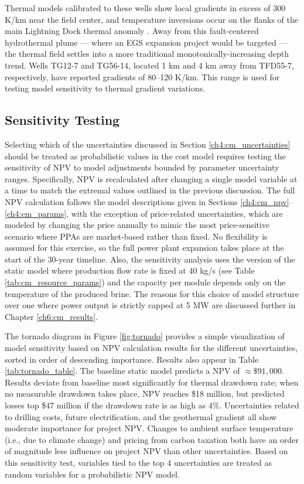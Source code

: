Thermal models calibrated to these wells show local gradients in excess of 300 K/km near the field center, and temperature inversions occur on the flanks of the main Lightning Dock thermal anomaly \citep[see Figs.\ 23--24,][]{cunniff_final_2005}. Away from this fault-centered hydrothermal plume --- where an EGS expansion project would be targeted --- the thermal field settles into a more traditional monotonically-increasing depth trend. Wells TG12-7 and TG56-14, located 1 km and 4 km away from TFD55-7, respectively, have reported gradients of 80--120 K/km. This range is used for testing model sensitivity to thermal gradient variations.

\subsection{Sensitivity Testing}\label{ch4:sensitivity}
Selecting which of the uncertainties discussed in Section \ref{ch4:cm_uncertainties} should be treated as probabilistic values in the cost model requires testing the sensitivity of NPV to model adjustments bounded by parameter uncertainty ranges. Specifically, NPV is recalculated after changing a single model variable at a time to match the extremal values outlined in the previous discussion. The full NPV calculation follows the model descriptions given in Sections \ref{ch4:cm_npv}--\ref{ch4:cm_params}, with the exception of price-related uncertainties, which are modeled by changing the price annually to mimic the most price-sensitive scenario where PPAs are market-based rather than fixed. No flexibility is assumed for this exercise, so the full power plant expansion takes place at the start of the 30-year timeline. Also, the sensitivity analysis uses the version of the static model where production flow rate is fixed at 40 kg/s (see Table \ref{tab:cm_resource_params}) and the capacity per module depends only on the temperature of the produced brine. The reasons for this choice of model structure over one where power output is strictly capped at 5 MW are discussed further in Chapter \ref{ch6:cm_results}.

The tornado diagram in Figure \ref{fig:tornado} provides a simple visualization of model sensitivity based on NPV calculation results for the different uncertainties, sorted in order of descending importance. Results also appear in Table \ref{tab:tornado_table}. The baseline static model predicts a NPV of $\approx \$91,000$. Results deviate from baseline most significantly for thermal drawdown rate; when no measurable drawdown takes place, NPV reaches \$18 million, but predicted losses top \$47 million if the drawdown rate is as high as 4\%. Uncertainties related to drilling costs, future electrification, and the geothermal gradient all show moderate importance for project NPV. Changes to ambient surface temperature (i.e., due to climate change) and pricing from carbon taxation both have an order of magnitude less influence on project NPV than other uncertainties. Based on this sensitivity test, variables tied to the top 4 uncertainties are treated as random variables for a probabilistic NPV model.

